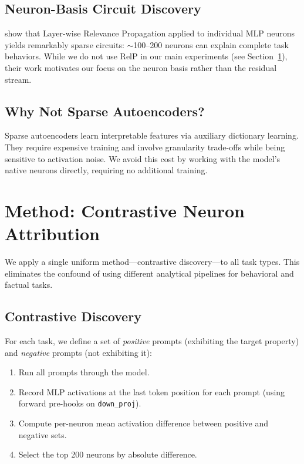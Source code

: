 \documentclass{article}
\begin{document}
\subsection{Neuron-Basis Circuit Discovery}

\citet{arora2025circuits} show that Layer-wise Relevance Propagation applied to individual MLP neurons yields remarkably sparse circuits: ${\sim}$100--200 neurons can explain complete task behaviors.
While we do not use RelP in our main experiments (see Section~\ref{sec:method}), their work motivates our focus on the neuron basis rather than the residual stream.

\subsection{Why Not Sparse Autoencoders?}

Sparse autoencoders \citep{bricken2023monosemanticity} learn interpretable features via auxiliary dictionary learning.
They require expensive training and involve granularity trade-offs while being sensitive to activation noise.
We avoid this cost by working with the model's native neurons directly, requiring no additional training.

\section{Method: Contrastive Neuron Attribution}
\label{sec:method}

We apply a single uniform method---contrastive discovery---to all task types.
This eliminates the confound of using different analytical pipelines for behavioral and factual tasks.

\subsection{Contrastive Discovery}

For each task, we define a set of \emph{positive} prompts (exhibiting the target property) and \emph{negative} prompts (not exhibiting it):
\begin{enumerate}
\item Run all prompts through the model.
\item Record MLP activations at the last token position for each prompt (using forward pre-hooks on \texttt{down\_proj}).
\item Compute per-neuron mean activation difference between positive and negative sets.
\item Select the top 200 neurons by absolute difference.
\end{enumerate}
\end{document}
